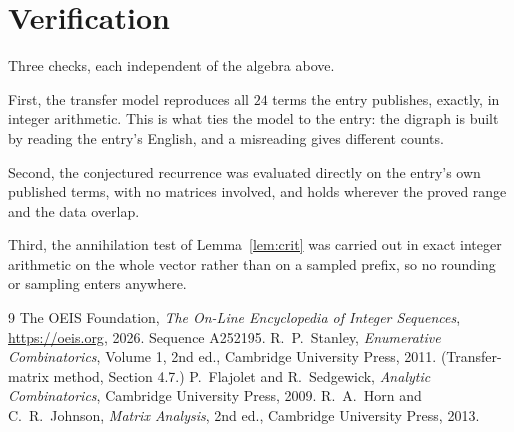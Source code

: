 \documentclass[11pt,a4paper]{article}
\theoremstyle{plain}
\theoremstyle{definition}
\begin{document}
\section{Verification}

Three checks, each independent of the algebra above.

First, the transfer model reproduces all $24$ terms the entry publishes, exactly, in
integer arithmetic. This is what ties the model to the entry: the digraph is built by reading
the entry's English, and a misreading gives different counts.

Second, the conjectured recurrence was evaluated directly on the entry's own published terms,
with no matrices involved, and holds wherever the proved range and the data overlap.

Third, the annihilation test of Lemma~\ref{lem:crit} was carried out in exact integer
arithmetic on the whole vector rather than on a sampled prefix, so no rounding or sampling
enters anywhere.

\begin{thebibliography}{9}
 The OEIS Foundation, \emph{The On-Line Encyclopedia of Integer
Sequences}, \url{https://oeis.org}, 2026. Sequence A252195.
 R.~P.~Stanley, \emph{Enumerative Combinatorics}, Volume 1, 2nd ed.,
Cambridge University Press, 2011. (Transfer-matrix method, Section 4.7.)
 P.~Flajolet and R.~Sedgewick, \emph{Analytic Combinatorics}, Cambridge
University Press, 2009.
 R.~A.~Horn and C.~R.~Johnson, \emph{Matrix Analysis}, 2nd ed., Cambridge
University Press, 2013.
\end{thebibliography}
\end{document}
